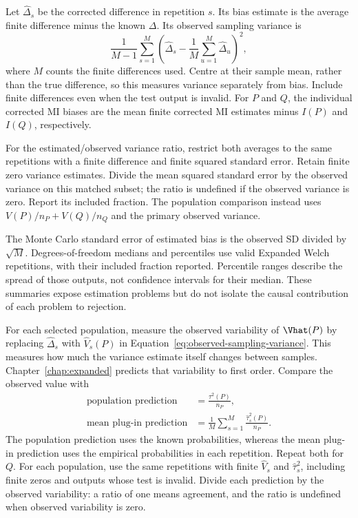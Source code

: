 Let \(\widehat\Delta_s\) be the corrected difference in repetition
\(s\). Its bias estimate is the average finite difference minus the
known \(\Delta\). Its observed sampling variance is
\begin{equation}
 \frac{1}{M-1}\sum_{s=1}^M
 \left(\widehat\Delta_s-\frac{1}{M}\sum_{u=1}^M\widehat\Delta_u\right)^2,
 \label{eq:observed-sampling-variance}
\end{equation}
where \(M\) counts the finite differences used. Centre at their sample
mean, rather than the true difference, so this measures variance
separately from bias. Include finite differences even when the test
output is invalid. For \(P\) and \(Q\), the individual corrected MI biases
are the mean finite corrected MI estimates minus \(I(P)\) and \(I(Q)\),
respectively.

For the estimated/observed variance ratio, restrict both averages to
the same repetitions with a finite difference and finite squared
standard error. Retain finite zero variance estimates. Divide the mean
squared standard error by the observed variance on this matched subset;
the ratio is undefined if the observed variance is zero. Report its
included fraction. The population comparison instead uses
\(V(P)/n_P+V(Q)/n_Q\) and the primary observed variance.

The Monte Carlo standard error of estimated bias is the observed SD
divided by \(\sqrt M\). Degrees-of-freedom medians and percentiles
use valid Expanded Welch repetitions, with their included fraction
reported. Percentile ranges describe the spread of those outputs,
not confidence intervals for their median. These summaries expose
estimation problems but do not isolate the causal contribution of
each problem to rejection.

\medskip
{}

For each selected population, measure the observed variability of
\(\Vhat(P)\) by replacing \(\widehat\Delta_s\) with
\(\widehat V_s(P)\) in Equation~\eqref{eq:observed-sampling-variance}.
This measures how much the variance estimate itself changes between
samples. Chapter~\ref{chap:expanded} predicts that variability to first
order. Compare the observed value with
\begin{equation}
\begin{aligned}
 \text{population prediction}&=\frac{\tau^2(P)}{n_P},\\
 \text{mean plug-in prediction}&=
 \frac{1}{M}\sum_{s=1}^{M}\frac{\widehat\tau_s^2(P)}{n_P}.
\end{aligned}
 \label{eq:variance-stability-predictions}
\end{equation}
The population prediction uses the known probabilities, whereas the mean plug-in
prediction uses the empirical probabilities in each repetition. Repeat both for
\(Q\). For each population, use the same repetitions with finite
\(\widehat V_s\) and \(\widehat\tau_s^2\), including finite zeros
and outputs whose test is invalid. Divide each prediction by the observed
variability: a ratio of one means agreement, and the ratio is undefined
when observed variability is zero.

